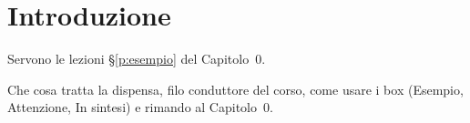 \chapter{Introduzione}\label{cap:intro}

\begin{prerequisiti}
Servono le lezioni \S\ref{p:esempio} del Capitolo~0.
\end{prerequisiti}

Che cosa tratta la dispensa, filo conduttore del corso, come usare i box (Esempio, Attenzione, In sintesi) e rimando al Capitolo~0.
